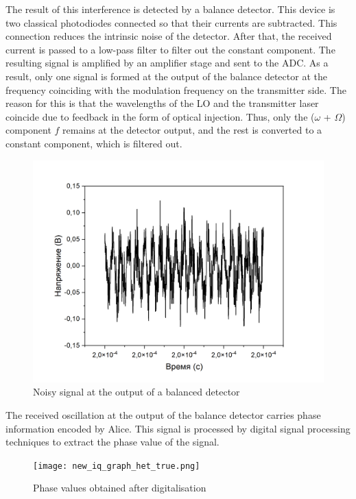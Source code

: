 \newline The result of this interference is detected by a balance detector. This device is two classical photodiodes connected so that their currents are subtracted. This connection reduces the intrinsic noise of the detector. After that, the received current is passed to a low-pass filter to filter out the constant component. The resulting signal is amplified by an amplifier stage and sent to the ADC.  As a result, only one signal is formed at the output of the balance detector at the frequency coinciding with the modulation frequency on the transmitter side. The reason for this is that the wavelengths of the LO and the transmitter laser coincide due to feedback in the form of optical injection. Thus, only the ($\omega$ + $\Omega$) component $f$ remains at the detector output, and the rest is converted to a constant component, which is filtered out. 
\begin{figure}
    \centering
    \includegraphics[width=\textwidth]{images/03.png}
    \caption{Noisy signal at the output of a balanced detector}
    \label{fig:noisy output inject syn}
\end{figure}
The received oscillation at the output of the balance detector carries phase information encoded by Alice. This signal is processed by digital signal processing techniques to extract the phase value of the signal. 
\begin{figure}
    \centering
    \texttt{[image: new\_iq\_graph\_het\_true.png]}
    \caption{Phase values obtained after digitalisation}
    \label{fig:phase meas ijnect syn}
\end{figure}

